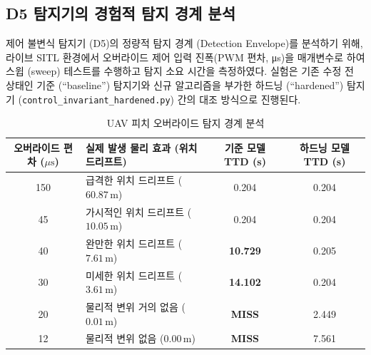 \subsection{D5 탐지기의 경험적 탐지 경계 분석}
\label{subsec:defense_robustness_envelope}

\noindent 
제어 불변식 탐지기 (D5)의 정량적 탐지 경계 (Detection Envelope)를 분석하기 위해, 라이브 SITL 환경에서 오버라이드 제어 입력 진폭(PWM 편차, μs)을 매개변수로 하여 스윕 (sweep) 테스트를 수행하고 탐지 소요 시간을 측정하였다. 실험은 기존 수정 전 상태인 기준 (``baseline'') 탐지기와 신규 알고리즘을 부가한 하드닝 (``hardened'') 탐지기 (\texttt{control\_invariant\_hardened.py}) 간의 대조 방식으로 진행된다.

\begin{table}[t!]
\centering
\caption{UAV 피치 오버라이드 탐지 경계 분석}
\label{tab:d5_envelope}
\renewcommand{\arraystretch}{1.2}
\small
\begin{tabularx}{\textwidth}{c l c c}
\toprule
\textbf{오버라이드 편차 ($\mu\text{s}$)} & \textbf{실제 발생 물리 효과 (위치 드리프트)} & \textbf{기준 모델 TTD (s)} & \textbf{하드닝 모델 TTD (s)} \\
\midrule
150 & 급격한 위치 드리프트 ($60.87\,\text{m}$) & 0.204 & 0.204 \\
45  & 가시적인 위치 드리프트 ($10.05\,\text{m}$) & 0.204 & 0.204 \\
40  & 완만한 위치 드리프트 ($7.61\,\text{m}$)   & \textbf{10.729} & 0.205 \\
30  & 미세한 위치 드리프트 ($3.61\,\text{m}$)   & \textbf{14.102} & 0.204 \\
20  & 물리적 변위 거의 없음 ($0.01\,\text{m}$)  & \textbf{MISS}   & 2.449 \\
12  & 물리적 변위 없음 ($0.00\,\text{m}$)       & \textbf{MISS}   & 7.561 \\
\bottomrule
\end{tabularx}
\end{table}

